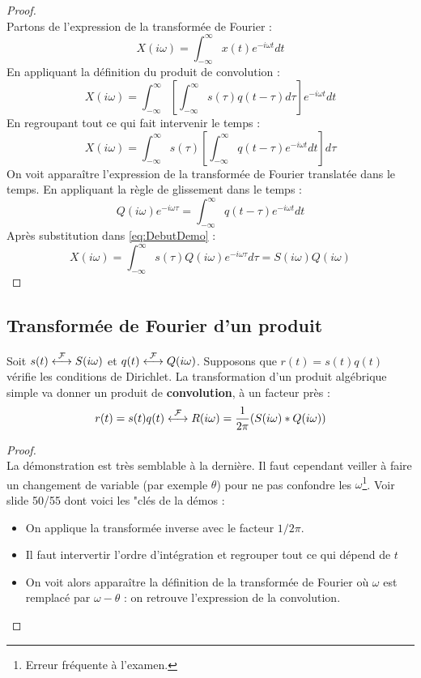 \begin{proof}\ \\
	Partons de l'expression de la transformée de Fourier :
	\begin{equation}
		X(i\omega) = \int_{-\infty}^\infty x(t)e^{-i\omega t}dt
		\label{eq:DebutDemo}
	\end{equation}
	En appliquant la définition du produit de convolution :
	\begin{equation}
		X(i\omega) = \int_{-\infty}^\infty \left[\int_{-\infty}^\infty s(\tau)q(t-\tau)d\tau
		\right]e^{-i\omega t}dt
	\end{equation}
	En regroupant tout ce qui fait intervenir le temps :
	\begin{equation}
		X(i\omega) = \int_{-\infty}^\infty s(\tau)\left[\int_{-\infty}^\infty q(t-\tau)e^{-i
			\omega t}dt\right]d\tau
	\end{equation}
	On voit apparaître l'expression de la transformée de Fourier translatée dans le temps. En
	appliquant la règle de glissement dans le temps : 
	\begin{equation}
		Q(i\omega)e^{-i\omega \tau} = \int_{-\infty}^\infty q(t-\tau)e^{-i\omega t}dt
	\end{equation}
	Après substitution dans \autoref{eq:DebutDemo} :
	\begin{equation}
		X(i\omega) = \int_{-\infty}^\infty s(\tau)Q(i\omega)e^{-i\omega\tau}d\tau = S(i\omega)Q(i
		\omega)
	\end{equation}
\end{proof}
	
\subsection{Transformée de Fourier d'un produit}
Soit $s(t) \ft S(i\omega)$ et $q(t) \ft Q(i\omega)$. Supposons que $r(t) = s(t)q(t)$ 
vérifie les conditions de Dirichlet. La transformation d'un produit algébrique simple 
va donner un produit de \textbf{convolution}, à un facteur près :
\begin{equation}
	r(t) = s(t)q(t) \ft R(i\omega) = \frac{1}{2\pi}(S(i\omega)*Q(i\omega))
\end{equation}
	
\begin{proof}\ \\
	La démonstration est très semblable à la dernière. Il faut cependant veiller à faire un 
	changement de variable (par exemple $\theta$) pour ne pas confondre les $\omega$\footnote{
	Erreur fréquente à l'examen.}. Voir slide 50/55 dont voici les "clés de la démos :
	\begin{itemize}
		\item On applique la transformée inverse avec le facteur $1/2\pi$.
		\item Il faut intervertir l'ordre d'intégration et regrouper tout ce qui dépend de $t$
		\item On voit alors apparaître la définition de la transformée de Fourier où  $\omega$
		      est remplacé par $\omega-\theta$ : on retrouve l'expression de la convolution.
	\end{itemize}
\end{proof}
	
